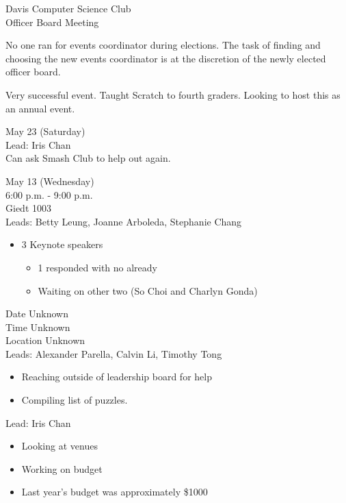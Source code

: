 \documentclass{article}
\begin{document}
\begin{Minutes}{Davis Computer Science Club\\Officer Board Meeting}

No one ran for events coordinator during elections. The task of finding and choosing the new events coordinator is at the discretion of the newly elected officer board.


Very successful event. Taught Scratch to fourth graders. Looking to host this as an annual event.


May 23 (Saturday)\\
Lead: Iris Chan\\

Can ask Smash Club to help out again.


May 13 (Wednesday)\\
6:00 p.m. - 9:00 p.m.\\
Giedt 1003\\
Leads: Betty Leung, Joanne Arboleda, Stephanie Chang

\begin{itemize}
	\item 3 Keynote speakers
	\begin{itemize}
		\item 1 responded with no already
		\item Waiting on other two (So Choi and Charlyn Gonda)
	\end{itemize}
\end{itemize}


Date Unknown\\
Time Unknown\\
Location Unknown\\
Leads: Alexander Parella, Calvin Li, Timothy Tong\\

\begin{itemize}
	\item Reaching outside of leadership board for help
	\item Compiling list of puzzles.
\end{itemize}


Lead: Iris Chan

\begin{itemize}
	\item Looking at venues
	\item Working on budget
	\item Last year's budget was approximately \$1000
\end{itemize}


\end{Minutes}
\end{document}
